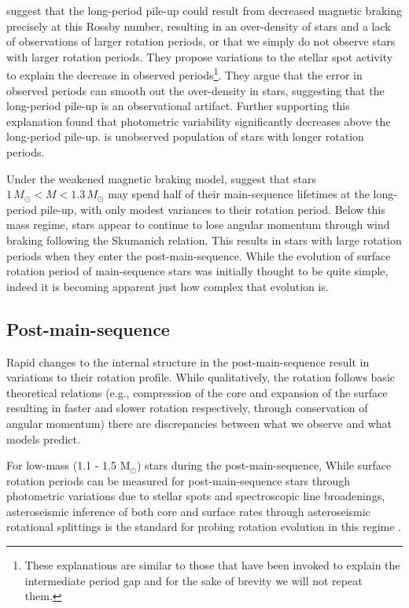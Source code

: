 \citet{van_saders_forward_2019} suggest that the long-period pile-up could result from decreased magnetic braking precisely at this Rossby number, resulting in an over-density of stars and a lack of observations of larger rotation periods, or that we simply do not observe stars with larger rotation periods.
They propose variations to the stellar spot activity to explain the decrease in observed periods\footnote{These explanations are similar to those that have been invoked to explain the intermediate period gap and for the sake of brevity we will not repeat them.}.
They argue that the error in observed periods can smooth out the over-density in stars, suggesting that the long-period pile-up is an observational artifact.
Further supporting this explanation \citet{david_further_2022} found that photometric variability significantly decreases above the long-period pile-up.
 is unobserved population of stars with longer rotation periods.

Under the weakened magnetic braking model, \citet{david_further_2022} suggest that stars $1\,M_{\odot} < M < 1.3\,M_{\odot}$  may spend half of their main-sequence lifetimes at the long-period pile-up, with only modest variances to their rotation period.
Below this mass regime, stars appear to continue to lose angular momentum through wind braking following the Skumanich relation.
This results in stars with large rotation periods when they enter the post-main-sequence.
While the evolution of surface rotation period of main-sequence stars was initially thought to be quite simple, indeed it is becoming apparent just how complex that evolution is.


\subsection{Post-main-sequence}

Rapid changes to the internal structure in the post-main-sequence result in variations to their rotation profile.
While qualitatively, the rotation follows basic theoretical relations (e.g., compression of the core and expansion of the surface resulting in faster and slower rotation respectively, through conservation of angular momentum) there are discrepancies between what we observe and what models predict.

For low-mass (1.1 - 1.5 M$_{\odot}$) stars during the post-main-sequence, 
While surface rotation periods can be measured for post-main-sequence stars through photometric variations due to stellar spots \citep{mcquillan_rotation_2014, ceillier_surface_2017} and spectroscopic line broadenings, asteroseismic inference of both core and surface rates through asteroseismic rotational splittings is the standard for probing rotation evolution in this regime \citep{deheuvels_seismic_2014, gehan_core_2018, deheuvels_seismic_2020, fellay_asteroseismology_2021}.

